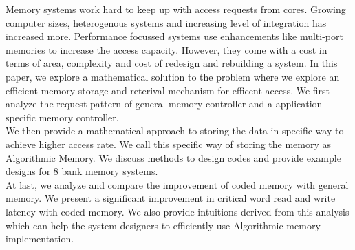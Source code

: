 Memory systems work hard to keep up with access requests from cores. Growing computer sizes, heterogenous systems and increasing level of integration has increased more. Performance focussed systems use enhancements like multi-port memories to increase the access capacity. However, they come with a cost in terms of area, complexity and cost of redesign and rebuilding a system. In this paper, we explore a mathematical solution to the problem where we explore an efficient memory storage and reterival mechanism for efficent access. We first analyze the request pattern of general memory controller and a application-specific memory controller. \\
We then provide a mathematical approach to storing the data in specific way to achieve higher access rate. We call this specific way of storing the memory as Algorithmic Memory. We discuss methods to design codes and provide example designs for 8 bank memory systems. \\
At last, we analyze and compare the improvement of coded memory with general memory. We present a significant improvement in critical word read and write latency with coded memory. We also provide intuitions derived from this analysis which can help the system designers to efficiently use Algorithmic memory implementation. 